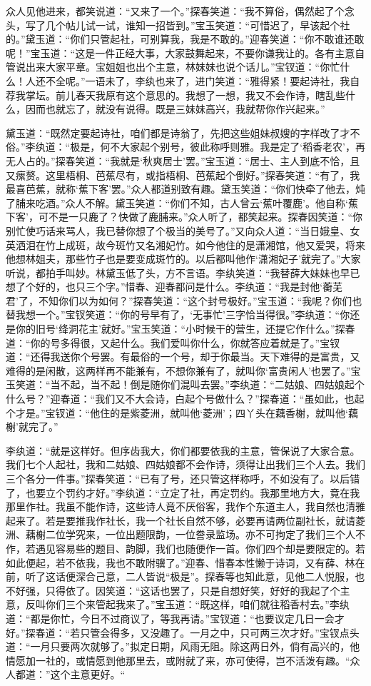 \documentclass[12pt,oneside]{book}
\begin{document}
众人见他进来，都笑说道：“又来了一个。”探春笑道：“我不算俗，偶然起了个念头，写了几个帖儿试一试，谁知一招皆到。”宝玉笑道：“可惜迟了，早该起个社的。”黛玉道：“你们只管起社，可别算我，我是不敢的。”迎春笑道：“你不敢谁还敢呢！”宝玉道：“这是一件正经大事，大家鼓舞起来，不要你谦我让的。各有主意自管说出来大家平章。宝姐姐也出个主意，林妹妹也说个话儿。”宝钗道：“你忙什么！人还不全呢。”一语未了，李纨也来了，进门笑道：“雅得紧！要起诗社，我自荐我掌坛。前儿春天我原有这个意思的。我想了一想，我又不会作诗，瞎乱些什么，因而也就忘了，就没有说得。既是三妹妹高兴，我就帮你作兴起来。”

黛玉道：“既然定要起诗社，咱们都是诗翁了，先把这些姐妹叔嫂的字样改了才不俗。”李纨道：“极是，何不大家起个别号，彼此称呼则雅。我是定了‘稻香老农’，再无人占的。”探春笑道：“我就是‘秋爽居士’罢。”宝玉道：“居士、主人到底不恰，且又瘰赘。这里梧桐、芭蕉尽有，或指梧桐、芭蕉起个倒好。”探春笑道：“有了，我最喜芭蕉，就称‘蕉下客’罢。”众人都道别致有趣。黛玉笑道：“你们快牵了他去，炖了脯来吃酒。”众人不解。黛玉笑道：“你们不知，古人曾云‘蕉叶覆鹿’。他自称‘蕉下客’，可不是一只鹿了？快做了鹿脯来。”众人听了，都笑起来。探春因笑道：“你别忙使巧话来骂人，我已替你想了个极当的美号了。”又向众人道：“当日娥皇、女英洒泪在竹上成斑，故今斑竹又名湘妃竹。如今他住的是潇湘馆，他又爱哭，将来他想林姐夫，那些竹子也是要变成斑竹的。以后都叫他作‘潇湘妃子’就完了。”大家听说，都拍手叫妙。林黛玉低了头，方不言语。李纨笑道：“我替薛大妹妹也早已想了个好的，也只三个字。”惜春、迎春都问是什么。李纨道：“我是封他‘蘅芜君’了，不知你们以为如何？”探春笑道：“这个封号极好。”宝玉道：“我呢？你们也替我想一个。”宝钗笑道：“你的号早有了，‘无事忙’三字恰当得很。”李纨道：“你还是你的旧号‘绛洞花主’就好。”宝玉笑道：“小时候干的营生，还提它作什么。”探春道：“你的号多得很，又起什么。我们爱叫你什么，你就答应着就是了。”宝钗道：“还得我送你个号罢。有最俗的一个号，却于你最当。天下难得的是富贵，又难得的是闲散，这两样再不能兼有，不想你兼有了，就叫你‘富贵闲人’也罢了。”宝玉笑道：“当不起，当不起！倒是随你们混叫去罢。”李纨道：“二姑娘、四姑娘起个什么号？”迎春道：“我们又不大会诗，白起个号做什么？”探春道：“虽如此，也起个才是。”宝钗道：“他住的是紫菱洲，就叫他‘菱洲’；四丫头在藕香榭，就叫他‘藕榭’就完了。”

李纨道：“就是这样好。但序齿我大，你们都要依我的主意，管保说了大家合意。我们七个人起社，我和二姑娘、四姑娘都不会作诗，须得让出我们三个人去。我们三个各分一件事。”探春笑道：“已有了号，还只管这样称呼，不如没有了。以后错了，也要立个罚约才好。”李纨道：“立定了社，再定罚约。我那里地方大，竟在我那里作社。我虽不能作诗，这些诗人竟不厌俗客，我作个东道主人，我自然也清雅起来了。若是要推我作社长，我一个社长自然不够，必要再请两位副社长，就请菱洲、藕榭二位学究来，一位出题限韵，一位誊录监场。亦不可拘定了我们三个人不作，若遇见容易些的题目、韵脚，我们也随便作一首。你们四个却是要限定的。若如此便起，若不依我，我也不敢附骥了。”迎春、惜春本性懒于诗词，又有薛、林在前，听了这话便深合己意，二人皆说“极是”。探春等也知此意，见他二人悦服，也不好强，只得依了。因笑道：“这话也罢了，只是自想好笑，好好的我起了个主意，反叫你们三个来管起我来了。”宝玉道：“既这样，咱们就往稻香村去。”李纨道：“都是你忙，今日不过商议了，等我再请。”宝钗道：“也要议定几日一会才好。”探春道：“若只管会得多，又没趣了。一月之中，只可两三次才好。”宝钗点头道：“一月只要两次就够了。”拟定日期，风雨无阻。除这两日外，倘有高兴的，他情愿加一社的，或情愿到他那里去，或附就了来，亦可使得，岂不活泼有趣。“众人都道：”这个主意更好。“
\end{document}
